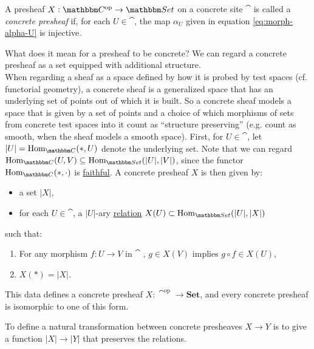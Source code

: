 \documentclass[a4paper,11pt]{article}  %
\begin{document}
\begin{definition}
	A {presheaf} $X : \cat^\op \to \Set$ on a {concrete site} $\cat$ is called a \emph{concrete presheaf} if, for each $U \in \cat$, the map $\alpha_U$ given in equation \eqref{eq:morph-alpha-U} is injective.
\end{definition}

\begin{remark}
	What does it mean for a presheaf to be concrete? We can regard a concrete presheaf as a set equipped with additional structure. \\
	When regarding a sheaf as a space defined by how it is probed by test spaces (cf. functorial geometry), a concrete sheaf is a generalized space that has an underlying set of points out of which it is built.
	So a concrete sheaf models a space that is given by a set of points and a choice of which morphisms of sets from concrete test spaces into it count as “structure preserving” (e.g. count as smooth, when the sheaf models a smooth space).
	First, for $U \in \cat$, let $|U|=\Hom_{\cat}(*,U)$ denote the underlying set. 
	Note that we can regard $\Hom_{\cat}(U, V) \subseteq \Hom_{\Set} (|U|, |V|)$, since the functor $\Hom_{\cat}(*,\cdot)$  is \href{https://ncatlab.org/nlab/show/faithful+functor}{faithful}.
	A concrete presheaf \(X\) is then given by:
	\begin{itemize}
		\item  a set $|X|$,
		\item  for each $U \in \cat$, a $|U|$-ary \href{https://ncatlab.org/nlab/show/relation\#DefinitionGeneralCase}{relation} $X(U) \subset  \Hom_{\Set} (|U|,|X|)$%
	\end{itemize}
	such that:
	\begin{enumerate}
		\item For any morphism $f : U \to V$ in $\cat$ , $ g \in X(V)$ implies $g \circ f \in X(U)$, 
		\item $X(*) = |X|$.
	\end{enumerate}

This data defines a concrete presheaf \(X : \cat^{\mathrm{op}} \to \mathbf{Set}\), and every concrete presheaf is isomorphic to one of this form.

\end{remark}






To define a natural transformation between concrete presheaves \(X \to Y\) is to give a function \(|X| \to |Y|\) that preserves the relations.
\end{document}
